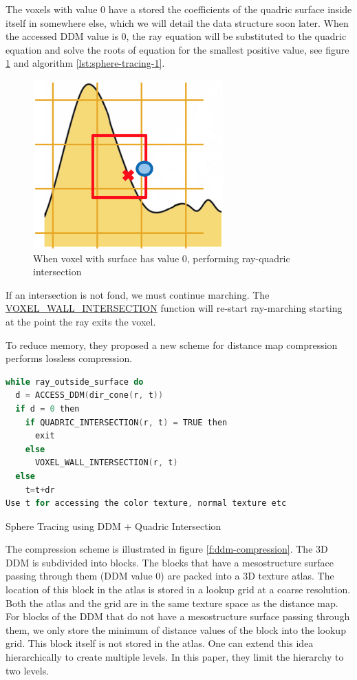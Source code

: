The voxels with value 0 have a stored the coefficients of the quadric surface inside itself in somewhere else, which we will detail the data structure soon later. When the accessed DDM value is 0, the ray equation will be substituted to the quadric equation and solve the roots of equation for the smallest positive value, see figure \ref{f:ray-quadric-intersection} and algorithm \ref{lst:sphere-tracing-1}.

\begin{figure}
\sidecaption
	\includegraphics[width=0.65\textwidth]{graphics/df/ddm-3}
	\caption{When voxel with surface has value 0, performing ray-quadric intersection}
	\label{f:ray-quadric-intersection}
\end{figure}

If an intersection is not fond, we must continue marching. The \url{VOXEL\_WALL\_INTERSECTION} function will re-start ray-marching starting at the point the ray exits the voxel. 

To reduce memory, they proposed a new scheme for distance map compression performs lossless compression.

\begin{algorithm}\label{lst:sphere-tracing-1}
\begin{lstlisting}[language=c++]
while ray_outside_surface do
  d = ACCESS_DDM(dir_cone(r, t))
  if d = 0 then
	if QUADRIC_INTERSECTION(r, t) = TRUE then
  	  exit
	else
	  VOXEL_WALL_INTERSECTION(r, t)
  else
	t=t+dr
Use t for accessing the color texture, normal texture etc
\end{lstlisting}  
\caption{Sphere Tracing using DDM + Quadric Intersection}
\end{algorithm}

The compression scheme is illustrated in figure \ref{f:ddm-compression}. The 3D DDM is subdivided into blocks. The blocks that have a mesostructure surface passing through them (DDM value 0) are packed into a 3D texture atlas. The location of this block in the atlas is stored in a lookup grid at a coarse resolution. Both the atlas and the grid are in the same texture space as the distance map. For blocks of the DDM that do not have a mesostructure surface passing through them, we only store the minimum of distance values of the block into the lookup grid. This block itself is not stored in the atlas. One can extend this idea hierarchically to create multiple levels. In this paper, they limit the hierarchy to two levels.


